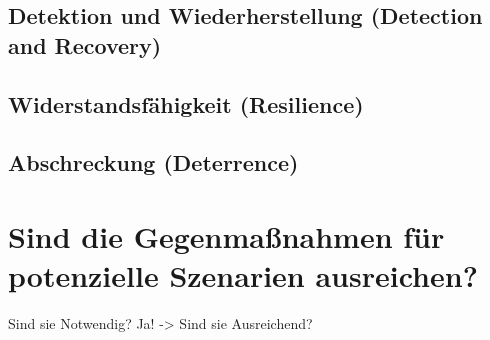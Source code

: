 \documentclass[final,bibliography=totocnumbered]{include/sikseminar}
\begin{document}
\subsection{Detektion und Wiederherstellung (Detection and Recovery)}\label{subsec:detektion}

\subsection{Widerstandsfähigkeit (Resilience)}\label{subsec:widerstand} %


\subsection{Abschreckung (Deterrence)}\label{subsec:abschreckung} %

\section{Sind die Gegenmaßnahmen für potenzielle Szenarien ausreichen?}\label{sec:diskussion}

Sind sie Notwendig?
Ja! -> Sind sie Ausreichend?

\newpage
\printglossary[type=\acronymtype]
~\nocite{*}

\printbibliography
\newpage
\end{document}
